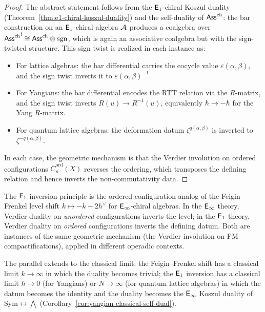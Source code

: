 \begin{proof}
The abstract statement follows from the $\mathsf{E}_1$-chiral Koszul duality
(Theorem~\ref{thm:e1-chiral-koszul-duality}) and the self-duality of
$\mathsf{Ass}^{\mathrm{ch}}$: the bar construction on an $\mathsf{E}_1$-chiral algebra
$\mathcal{A}$ produces a coalgebra over
${\mathsf{Ass}^{\mathrm{ch}}}^! \cong \mathsf{Ass}^{\mathrm{ch}} \otimes \mathrm{sgn}$, which is again an
associative coalgebra but with the sign-twisted structure.  This sign
twist is realized in each instance as:
\begin{itemize}
\item For lattice algebras: the bar differential carries the cocycle
  value $\varepsilon(\alpha,\beta)$, and the sign twist inverts it to
  $\varepsilon(\alpha,\beta)^{-1}$.
\item For Yangians: the bar differential encodes the RTT relation via
  the $R$-matrix, and the sign twist inverts
  $R(u) \to R^{-1}(u)$, equivalently $\hbar \to -\hbar$ for the
  Yang $R$-matrix.
\item For quantum lattice algebras: the deformation datum
  $\zeta^{q(\alpha,\beta)}$ is inverted to
  $\zeta^{-q(\alpha,\beta)}$.
\end{itemize}
In each case, the geometric mechanism is that the Verdier involution
on ordered configurations $\overline{C}^{\mathrm{ord}}_n(X)$ reverses
the ordering, which transposes the defining relation and hence
inverts the non-commutativity data.
\end{proof}

\begin{remark}
\label{rem:e1-ff-comparison}
The $\mathsf{E}_1$ inversion principle is the ordered-configuration analog
of the Feigin--Frenkel level shift $k \mapsto -k - 2h^\vee$ for
$\mathsf{E}_{\infty}$-chiral algebras.  In the $\mathsf{E}_{\infty}$ theory, Verdier duality on
\emph{unordered} configurations inverts the level; in the $\mathsf{E}_1$
theory, Verdier duality on \emph{ordered} configurations inverts the
defining datum.  Both are instances of the same geometric mechanism
(the Verdier involution on FM compactifications), applied in different
operadic contexts.

The parallel extends to the classical limit: the Feigin--Frenkel
shift has a classical limit $k \to \infty$ in which the duality
becomes trivial; the $\mathsf{E}_1$ inversion has a classical limit
$\hbar \to 0$ (for Yangians) or $N \to \infty$ (for quantum
lattice algebras) in which the datum becomes the identity and the
duality becomes the $\mathsf{E}_{\infty}$ Koszul duality of
$\mathrm{Sym} \leftrightarrow \bigwedge$
(Corollary~\ref{cor:yangian-classical-self-dual}).
\end{remark}



